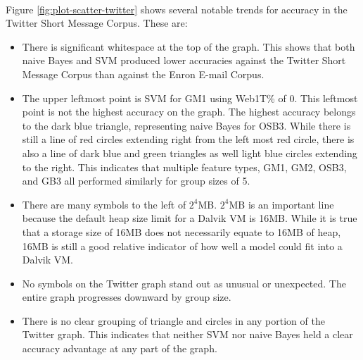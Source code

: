 \paragraph*{} Figure \ref{fig:plot-scatter-twitter} shows several notable trends for accuracy in the Twitter Short Message Corpus.  These are:
	\begin{itemize}
		\item There is significant whitespace at the top of the graph.  This shows that both naive Bayes and SVM produced lower accuracies against the Twitter Short Message Corpus than against the Enron E-mail Corpus.
		\item The upper leftmost point is SVM for GM1 using Web1T\% of 0.  This leftmost point is not the highest accuracy on the graph.  The highest accuracy belongs to the dark blue triangle, representing naive Bayes for OSB3.  While there is still a line of red circles extending right from the left most red circle, there is also a line of dark blue and green triangles as well light blue circles extending to the right.  This indicates that multiple feature types, GM1, GM2, OSB3, and GB3 all performed similarly for group sizes of 5.
		\item There are many symbols to the left of $2^4$MB. $2^4$MB is an important line because the default heap size limit for a Dalvik VM is 16MB.  While it is true that a storage size of 16MB does not necessarily equate to 16MB of heap, 16MB is still a good relative indicator of how well a model could fit into a Dalvik VM.
		\item No symbols on the Twitter graph stand out as unusual or unexpected.  The entire graph progresses downward by group size.
		\item There is no clear grouping of triangle and circles in any portion of the Twitter graph. This indicates that neither SVM nor naive Bayes held a clear accuracy advantage at any part of the graph.
		
	\end{itemize}

